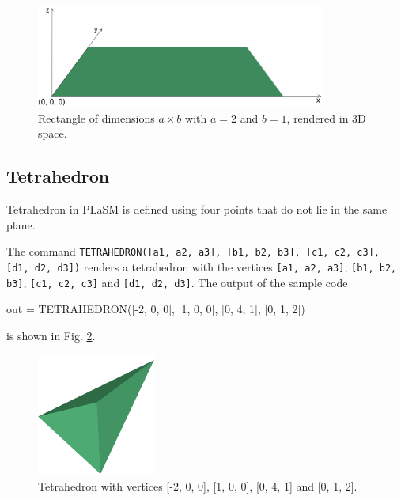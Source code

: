 \begin{figure}[!ht]
\begin{center}
\includegraphics[width=0.85\textwidth]{img/rect-111.png}
\end{center}
\vspace{-4mm}
\caption{Rectangle of dimensions $a \times b$ with $a = 2$ and $b = 1$, rendered in 3D space.}
\label{fig:rect-111}
\end{figure}
\noindent




\subsection{Tetrahedron}

Tetrahedron in PLaSM is defined using four points that do not lie in the same 
plane. 

The command {\tt TETRAHEDRON([a1, a2, a3], [b1, b2, b3], [c1, c2, c3], [d1, d2, d3])} renders 
a tetrahedron with the vertices {\tt [a1, a2, a3]}, {\tt [b1, b2, b3]}, {\tt [c1, c2, c3]}
and {\tt [d1, d2, d3]}. The output of the sample code

\begin{bluecode}
out = TETRAHEDRON([-2, 0, 0], [1, 0, 0], [0, 4, 1], [0, 1, 2])
\end{bluecode}
is shown in Fig. \ref{fig:chull}.

\begin{figure}[!ht]
\begin{center}
\includegraphics[width=0.35\textwidth]{img/chull.png}
\end{center}
\vspace{-4mm}
\caption{Tetrahedron with vertices [-2, 0, 0], [1, 0, 0], [0, 4, 1] and [0, 1, 2].}
\label{fig:chull}
\end{figure}
\noindent


